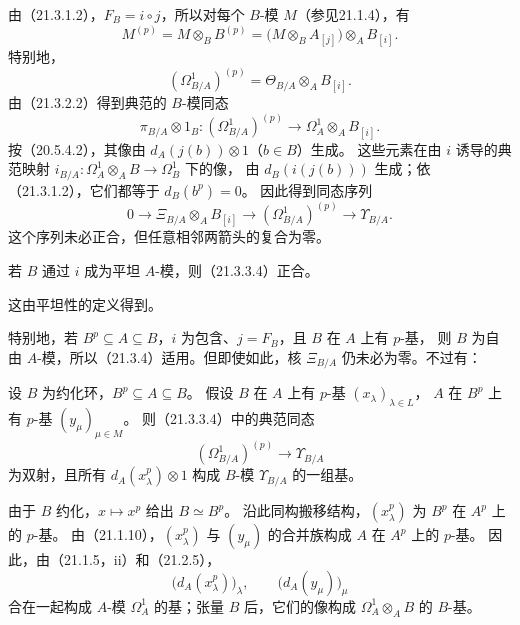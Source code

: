 由（21.3.1.2），$F_B=i\circ j$，所以对每个 $B$-模 $M$（参见21.1.4），有
\begin{equation}
 M^{(p)}=M\otimes_B B^{(p)}
 =\bigl(M\otimes_B A_{[j]}\bigr)\otimes_A B_{[i]}.
 \tag{21.3.3.1}
\end{equation}
特别地，
\begin{equation}
 (\Omega^1_{B/A})^{(p)}=\Theta_{B/A}\otimes_A B_{[i]}.
 \tag{21.3.3.2}
\end{equation}
由（21.3.2.2）得到典范的 $B$-模同态
\begin{equation}
 \pi_{B/A}\otimes1_B:
 (\Omega^1_{B/A})^{(p)}\longrightarrow\Omega^1_A\otimes_A B_{[i]}.
 \tag{21.3.3.3}
\end{equation}
按（20.5.4.2），其像由 $d_A(j(b))\otimes1$（$b\in B$）生成。
这些元素在由 $i$ 诱导的典范映射
$i_{B/A}:\Omega^1_A\otimes_A B\to\Omega^1_B$ 下的像，
由 $d_B(i(j(b)))$ 生成；依（21.3.1.2），它们都等于 $d_B(b^p)=0$。
因此得到同态序列
\begin{equation}
 0\longrightarrow\Xi_{B/A}\otimes_A B_{[i]}
 \longrightarrow(\Omega^1_{B/A})^{(p)}
 \longrightarrow\Upsilon_{B/A}.
 \tag{21.3.3.4}
\end{equation}
这个序列未必正合，但任意相邻两箭头的复合为零。

若 $B$ 通过 $i$ 成为平坦 $A$-模，则（21.3.3.4）正合。

这由平坦性的定义得到。

特别地，若 $B^p\subseteq A\subseteq B$，$i$ 为包含、$j=F_B$，且 $B$ 在 $A$ 上有 $p$-基，
则 $B$ 为自由 $A$-模，所以（21.3.4）适用。但即使如此，核 $\Xi_{B/A}$ 仍未必为零。不过有：

设 $B$ 为约化环，$B^p\subseteq A\subseteq B$。
假设 $B$ 在 $A$ 上有 $p$-基 $(x_\lambda)_{\lambda\in L}$，
$A$ 在 $B^p$ 上有 $p$-基 $(y_\mu)_{\mu\in M}$。
则（21.3.3.4）中的典范同态
\begin{equation}
 (\Omega^1_{B/A})^{(p)}\longrightarrow\Upsilon_{B/A}
 \tag{21.3.5.1}
\end{equation}
为双射，且所有 $d_A(x_\lambda^p)\otimes1$ 构成 $B$-模 $\Upsilon_{B/A}$ 的一组基。

\eproof
由于 $B$ 约化，$x\mapsto x^p$ 给出 $B\simeq B^p$。
沿此同构搬移结构，$(x_\lambda^p)$ 为 $B^p$ 在 $A^p$ 上的 $p$-基。
由（21.1.10），$(x_\lambda^p)$ 与 $(y_\mu)$ 的合并族构成 $A$ 在 $A^p$ 上的 $p$-基。
因此，由（21.1.5，ii）和（21.2.5），
\[
 \bigl(d_A(x_\lambda^p)\bigr)_\lambda,\qquad
 \bigl(d_A(y_\mu)\bigr)_\mu
\]
合在一起构成 $A$-模 $\Omega^1_A$ 的基；张量 $B$ 后，它们的像构成
$\Omega^1_A\otimes_A B$ 的 $B$-基。


